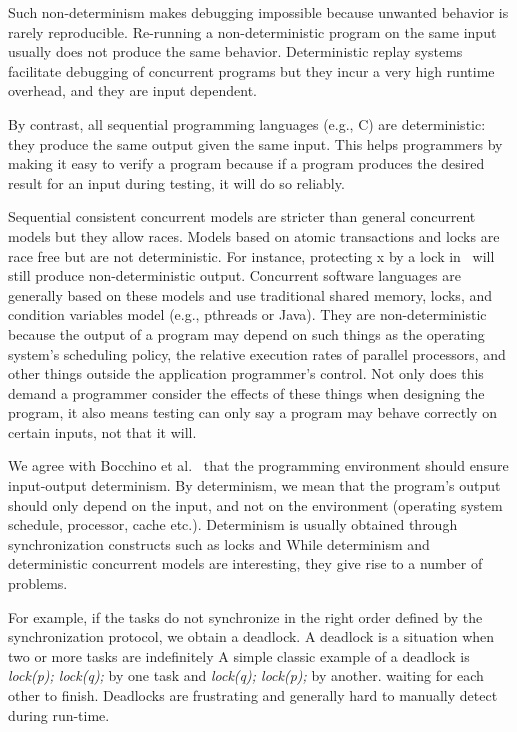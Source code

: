 \documentclass[10pt, conference, compsocconf]{IEEEtran}
\begin{document}
Such non-determinism makes debugging  impossible because unwanted behavior is 
rarely reproducible. Re-running a non-deterministic program on the same input usually does not 
produce the same behavior. Deterministic replay systems~\cite{choi1998deterministic,
altekar2009odr} facilitate debugging of concurrent 
programs but they incur a very high runtime overhead, and they are input dependent. 

By contrast, all sequential programming languages (e.g., C) are deterministic: they produce 
the same output given the same input. This helps programmers by 
making it easy to verify a program because if a program 
produces the desired result for an input during testing, it will do so reliably. 

Sequential consistent concurrent models are stricter than general concurrent models but they 
allow races. Models based on atomic transactions and locks are race free but are not deterministic. 
For instance, protecting x by a lock in~ will still produce non-deterministic output. Concurrent software languages are generally based on these models and use traditional shared memory, 
locks, and condition variables model (e.g., pthreads or Java). They are non-deterministic because 
the output of a program may depend on such things as the operating system’s scheduling policy, 
the relative execution rates of parallel processors, and other things outside the application programmer’s control. Not only does this demand a programmer consider the effects of these things 
when designing the program, it also means testing can only say a program may behave correctly 
on certain inputs, not that it will. 

We agree with Bocchino et al.~\cite{bocchino2009parallel}  that the programming environment should ensure input-output 
determinism. By determinism, we mean that the program’s output should only depend on the input, 
and not on the environment (operating system schedule, processor, cache etc.). Determinism is
usually obtained through synchronization constructs such as locks and 
While determinism and deterministic concurrent models are interesting, they give rise to a number of problems. 

For example, if the tasks do not synchronize in the right order deﬁned by the synchronization 
protocol, we obtain a deadlock.
A deadlock is a situation when two or more tasks are indeﬁnitely 
 A simple classic example of a deadlock is \emph{lock(p); lock(q);}
by one task and \emph{lock(q); lock(p);} by another. 
waiting for each other to ﬁnish. 
Deadlocks are frustrating and generally hard to manually detect 
during run-time. 
\end{document}

